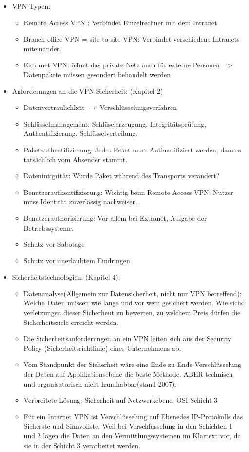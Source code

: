 \begin{itemize}
	\item VPN-Typen: \begin{itemize}	
					 \item Remote Access VPN : Verbindet Einzelrechner mit dem Intranet
					 \item Branch office VPN = site to site VPN: Verbindet verschiedene Intranets miteinander.
					 \item Extranet VPN: öffnet das private Netz auch für externe Personen => Datenpakete müssen gesondert behandelt werden
					 \end{itemize}	
   \item Anforderungen an die VPN Sicherheit: (Kapitel 2)
					\begin{itemize}
					\item Datenvertraulichkeit $\rightarrow$ Verschlüsselungsverfahren
					\item Schlüsselmanagement: Schlüselerzeugung, Integritätsprüfung, Authentifizierung, Schlüsselverteilung.
					\item Paketauthentifizierung: Jedes Paket muss Authentifiziert werden, dass es tatsächlich vom Absender stammt. 
					\item Datenintigrität: Wurde Paket während des Transports verändert?
					\item Benutzerauthentifizierung: Wichtig beim Remote Access VPN. Nutzer muss Identität zuverlässig nachweisen.
					\item Benutzerauthorisierung: Vor allem bei Extranet, Aufgabe der Betriebssysteme.
					\item Schutz vor Sabotage
					\item Schutz vor unerlaubtem Eindringen
					\end{itemize}
  \item Sicherheitstechnologien: (Kapitel 4): 
  					\begin{itemize}
  					\item Datenanalyse(Allgemein zur Datensicherheit, nicht nur VPN betreffend): Welche Daten müssen wie lange und vor wem gesichert werden. Wie sichd verletzungen dieser Sicherheut zu bewerten, zu welchem Preis dürfen die Sicherheitsziele erreicht werden. 
  					\item Die Sicherheitsanforderungen an ein VPN leiten sich aus der Security Policy (Sicherheitsrichtlinie) eines Unternehmens ab. 
  					\item Vom Standpunkt der Sicherheit wäre eine Ende zu Ende Verschlüsselung der Daten auf Applikationsebene die beste Methode. ABER technisch und organisatorisch nicht handhabbar(stand 2007).
  					\item Verbreitete Lösung: Sicherheit auf Netzwerkebene: OSI Schicht 3
  					\item Für ein Internet VPN ist Verschlüsselung auf Ebenedes IP-Protokolls das Sicherste und Sinnvollste. Weil bei Verschlüsselung in den Schichten 1 und 2 lägen die Daten an den Vermittlungssystemen im Klartext vor, da sie in der Schicht 3 verarbeitet werden. 
  					\end{itemize}					
 
\end{itemize}
